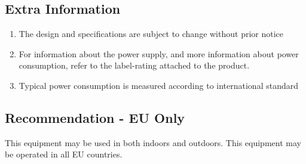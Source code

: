 \subsection{Extra Information}
\begin{enumerate}
	\item The design and specifications are subject to change without prior notice
	\item For information about the power supply, and more information about power consumption, refer
	to the label-rating attached to the product.
	\item Typical power consumption is measured according to international standard
\end{enumerate}

\subsection{Recommendation - EU Only}
This equipment may be used in both indoors and outdoors.
This equipment may be operated in all EU countries.
